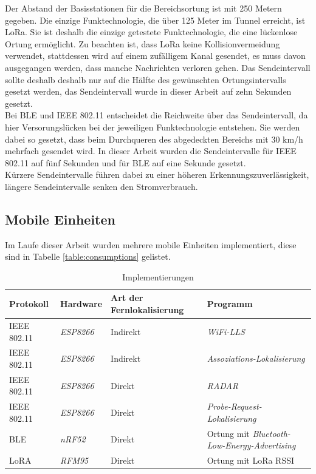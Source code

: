 Der Abstand der Basisstationen für die Bereichsortung ist mit 250 Metern gegeben. 
Die einzige Funktechnologie, die über 125 Meter im Tunnel erreicht, ist LoRa.
Sie ist deshalb die einzige getestete Funktechnologie, die eine lückenlose Ortung ermöglicht.
Zu beachten ist, dass LoRa keine Kollisionvermeidung verwendet, stattdessen wird auf einem zufälligem Kanal gesendet, es muss davon ausgegangen werden, dass manche Nachrichten verloren gehen.
Das Sendeintervall sollte deshalb deshalb nur auf die Hälfte des gewünschten Ortungsintervalls gesetzt werden, das Sendeintervall wurde in dieser Arbeit auf zehn Sekunden gesetzt.\\
Bei BLE und IEEE 802.11 entscheidet die Reichweite über das Sendeintervall, da hier Versorungslücken bei der jeweiligen Funktechnologie entstehen.
Sie werden dabei so gesetzt, dass beim Durchqueren des abgedeckten Bereichs mit 30 km/h mehrfach gesendet wird.
In dieser Arbeit wurden die Sendeintervalle für IEEE 802.11 auf fünf Sekunden und für BLE auf eine Sekunde gesetzt.\\
Kürzere Sendeintervalle führen dabei zu einer höheren Erkennungszuverlässigkeit, längere Sendeintervalle senken den Stromverbrauch.

\subsection{Mobile Einheiten}
Im Laufe dieser Arbeit wurden mehrere mobile Einheiten implementiert, diese sind in Tabelle \ref{table:consumptions} gelistet.

\begin{table}[h]
	\centering
	\caption{Implementierungen}
	\label{table:ranges}
	\begin{tabular}{l|l|p{2.5cm}|p{5.8cm}}
		Protokoll & Hardware & Art der Fernlokalisierung & Programm \\
		\hline
		IEEE 802.11 & \emph{ESP8266} & Indirekt & \emph{WiFi-LLS} \cite{chen2007design} \\
		IEEE 802.11 & \emph{ESP8266} & Indirekt & \emph{Assoziations-Lokalisierung} \\
		\hline
		IEEE 802.11 & \emph{ESP8266} & Direkt & \emph{RADAR} \cite{bahl2000radar} \\
		IEEE 802.11 & \emph{ESP8266} & Direkt & \emph{Probe-Request-Lokalisierung} \\
		\hline
		BLE & \emph{nRF52} & Direkt & Ortung mit \emph{Bluetooth-Low-Energy-Advertising} \cite{jianyong2014rssi} \\
		\hline
		LoRA & \emph{RFM95} & Direkt & Ortung mit LoRa RSSI \\
	\end{tabular}
\end{table}

